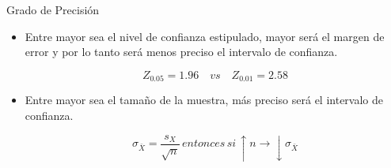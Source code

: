 \documentclass{beamer}
\begin{document}
\begin{frame}{Grado de Precisión}
\begin{itemize}
\justifying
\item Entre mayor sea el nivel de confianza estipulado, mayor será el margen de error y por lo tanto será menos preciso el intervalo de confianza.

$$ Z_{0.05}=1.96 \quad vs \quad Z_{0.01}=2.58$$

\item Entre mayor sea el tamaño de la muestra, más preciso será el intervalo de confianza.

$$\sigma_{\bar{X}}=\dfrac{s_X}{\sqrt{n}}\, entonces \, si\, \uparrow n \rightarrow \downarrow \sigma_{\bar{X}}  $$
\end{itemize}
\end{frame}
\end{document}
